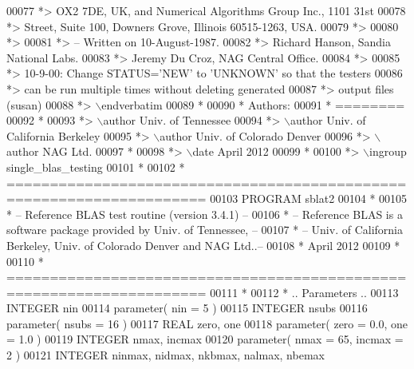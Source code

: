 \begin{DoxyCode}
00077 \textcolor{comment}{*>       OX2 7DE, UK,  and  Numerical Algorithms Group Inc.,  1101  31st}
00078 \textcolor{comment}{*>       Street,  Suite 100,  Downers Grove,  Illinois 60515-1263,  USA.}
00079 \textcolor{comment}{*>}
00080 \textcolor{comment}{*>}
00081 \textcolor{comment}{*> -- Written on 10-August-1987.}
00082 \textcolor{comment}{*>    Richard Hanson, Sandia National Labs.}
00083 \textcolor{comment}{*>    Jeremy Du Croz, NAG Central Office.}
00084 \textcolor{comment}{*>}
00085 \textcolor{comment}{*>    10-9-00:  Change STATUS='NEW' to 'UNKNOWN' so that the testers}
00086 \textcolor{comment}{*>              can be run multiple times without deleting generated}
00087 \textcolor{comment}{*>              output files (susan)}
00088 \textcolor{comment}{*> \(\backslash\)endverbatim}
00089 \textcolor{comment}{*}
00090 \textcolor{comment}{*  Authors:}
00091 \textcolor{comment}{*  ========}
00092 \textcolor{comment}{*}
00093 \textcolor{comment}{*> \(\backslash\)author Univ. of Tennessee }
00094 \textcolor{comment}{*> \(\backslash\)author Univ. of California Berkeley }
00095 \textcolor{comment}{*> \(\backslash\)author Univ. of Colorado Denver }
00096 \textcolor{comment}{*> \(\backslash\)author NAG Ltd. }
00097 \textcolor{comment}{*}
00098 \textcolor{comment}{*> \(\backslash\)date April 2012}
00099 \textcolor{comment}{*}
00100 \textcolor{comment}{*> \(\backslash\)ingroup single\_blas\_testing}
00101 \textcolor{comment}{*}
00102 \textcolor{comment}{*  =====================================================================}
00103       \textcolor{keyword}{PROGRAM} sblat2
00104 \textcolor{comment}{*}
00105 \textcolor{comment}{*  -- Reference BLAS test routine (version 3.4.1) --}
00106 \textcolor{comment}{*  -- Reference BLAS is a software package provided by Univ. of Tennessee,    --}
00107 \textcolor{comment}{*  -- Univ. of California Berkeley, Univ. of Colorado Denver and NAG Ltd..--}
00108 \textcolor{comment}{*     April 2012}
00109 \textcolor{comment}{*}
00110 \textcolor{comment}{*  =====================================================================}
00111 \textcolor{comment}{*}
00112 \textcolor{comment}{*     .. Parameters ..}
00113       \textcolor{keywordtype}{INTEGER}            nin
00114       parameter( nin = 5 )
00115       \textcolor{keywordtype}{INTEGER}            nsubs
00116       parameter( nsubs = 16 )
00117       \textcolor{keywordtype}{REAL}               zero, one
00118       parameter( zero = 0.0, one = 1.0 )
00119       \textcolor{keywordtype}{INTEGER}            nmax, incmax
00120       parameter( nmax = 65, incmax = 2 )
00121       \textcolor{keywordtype}{INTEGER}            ninmax, nidmax, nkbmax, nalmax, nbemax

\end{DoxyCode}
